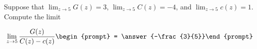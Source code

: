 \documentclass{ximera}
\author{Matthew Carr}
\begin{document}
\begin{exercise}
Suppose that $\lim_{z\to5}G(z)=3$, $\lim_{z\to5}C(z)=-4$, and $\lim_{z\to5}c(z)=1$. Compute the limit

\[
\lim_{z\to 5 } \frac{G(z)}{C(z)-c(z)}\begin{prompt} = \answer{-\frac{3}{5}}\end{prompt}
\]
\end{exercise}
\end{document}
